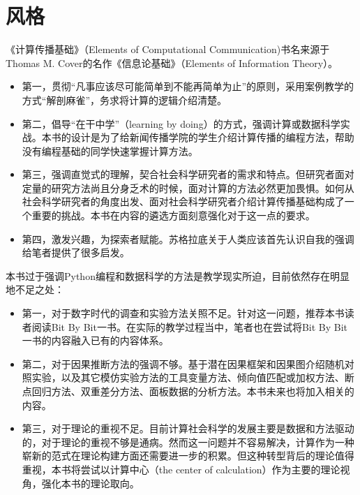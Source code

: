 \documentclass[letterpaper,10pt,english]{sphinxmanual}
\begin{document}


\chapter{风格}
\label{\detokenize{index:id4}}
《计算传播基础》（Elements of Computational Communication)书名来源于Thomas M. Cover的名作《信息论基础》（Elements of Information Theory）。
\begin{itemize}
\item {} 
第一，贯彻“凡事应该尽可能简单到不能再简单为止”的原则，采用案例教学的方式“解剖麻雀”，务求将计算的逻辑介绍清楚。

\item {} 
第二，倡导“在干中学”（learning by doing）的方式，强调计算或数据科学实战。本书的设计是为了给新闻传播学院的学生介绍计算传播的编程方法，帮助没有编程基础的同学快速掌握计算方法。

\item {} 
第三，强调直觉式的理解，契合社会科学研究者的需求和特点。但研究者面对定量的研究方法尚且分身乏术的时候，面对计算的方法必然更加畏惧。如何从社会科学研究者的角度出发、面对社会科学研究者介绍计算传播基础构成了一个重要的挑战。本书在内容的遴选方面刻意强化对于这一点的要求。

\item {} 
第四，激发兴趣，为探索者赋能。苏格拉底关于人类应该首先认识自我的强调给笔者提供了很多启发。

\end{itemize}

本书过于强调Python编程和数据科学的方法是教学现实所迫，目前依然存在明显地不足之处：
\begin{itemize}
\item {} 
第一，对于数字时代的调查和实验方法关照不足。针对这一问题，推荐本书读者阅读Bit By Bit一书。在实际的教学过程当中，笔者也在尝试将Bit By Bit一书的内容融入已有的内容体系。

\item {} 
第二，对于因果推断方法的强调不够。基于潜在因果框架和因果图介绍随机对照实验，以及其它模仿实验方法的工具变量方法、倾向值匹配或加权方法、断点回归方法、双重差分方法、面板数据的分析方法。本书未来也将加入相关的内容。

\item {} 
第三，对于理论的重视不足。目前计算社会科学的发展主要是数据和方法驱动的，对于理论的重视不够是通病。然而这一问题并不容易解决，计算作为一种崭新的范式在理论构建方面还需要进一步的积累。但这种转型背后的理论值得重视，本书将尝试以计算中心（the center of calculation）作为主要的理论视角，强化本书的理论取向。

\end{itemize}
\end{document}

